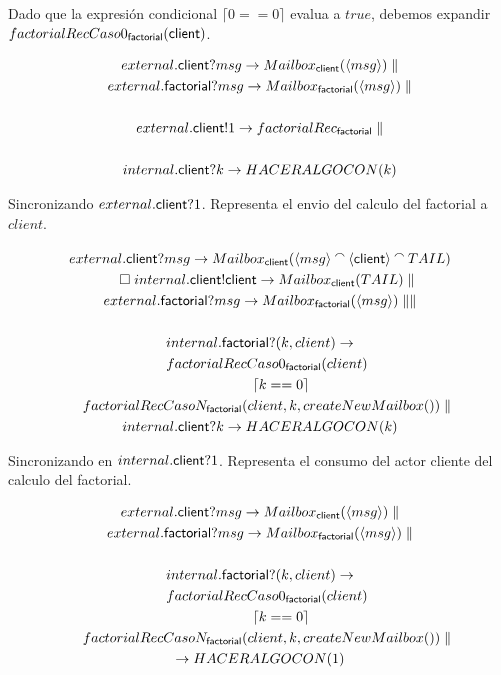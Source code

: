 \documentclass[fleqn]{article}
\newcommand{\myList}[1]{\langle #1 \rangle}
\newcommand{\myCons}[0]{\mathbin{\raise 0.8ex\hbox{$\smallfrown$}}}
\begin{document}
Dado que la expresión condicional $\lceil 0 == 0 \rceil$ evalua a $true$,
debemos expandir $factorialRecCaso0_{\mathsf{factorial}}(\mathsf{client})$.

\begin{gather*}
external.\mbc?msg \rightarrow Mailbox_\mbc(\myList{msg}) \parallel \\
external.\mbf?msg \rightarrow Mailbox_\mbf(\myList{msg}) \parallel \\ \\
external.\mbc!1 \rightarrow factorialRec_\mbf \parallel \\ \\
internal.\mbc?k \rightarrow HACERALGOCON(k) 
\end{gather*}

Sincronizando $external.\mathsf{client}?1$. Representa el envio del calculo del factorial a $client$. 

\begin{gather*}
external.\mbc?msg \rightarrow Mailbox_\mbc(\myList{msg} \myCons \myList{\mbc} \myCons TAIL) \\ 
\quad \square \; internal.\mbc!\mbc \rightarrow Mailbox_\mbc(TAIL) \parallel \\
external.\mbf?msg \rightarrow Mailbox_\mbf(\myList{msg}) \parallel \parallel \\ \\
internal.\mbf?(k,client) \rightarrow \\
\quad factorialRecCaso0_\mbf(client) \\
\quad \qquad \lceil k == 0 \rceil \\
\quad factorialRecCasoN_\mbf(client, k, createNewMailbox()) \parallel \\
internal.\mbc?k \rightarrow HACERALGOCON(k) 
\end{gather*}

Sincronizando en $internal.\mathsf{client}?1$. Representa el consumo del actor cliente del
calculo del factorial. 

\begin{gather*}
external.\mbc?msg \rightarrow Mailbox_\mbc(\myList{msg}) \parallel \\
external.\mbf?msg \rightarrow Mailbox_\mbf(\myList{msg}) \parallel \\ \\
internal.\mbf?(k,client) \rightarrow \\
\quad factorialRecCaso0_\mbf(client) \\
\quad \qquad \lceil k == 0 \rceil \\
\quad factorialRecCasoN_\mbf(client, k, createNewMailbox()) \parallel \\
\rightarrow HACERALGOCON(1) 
\end{gather*}


{}

\end{document}
